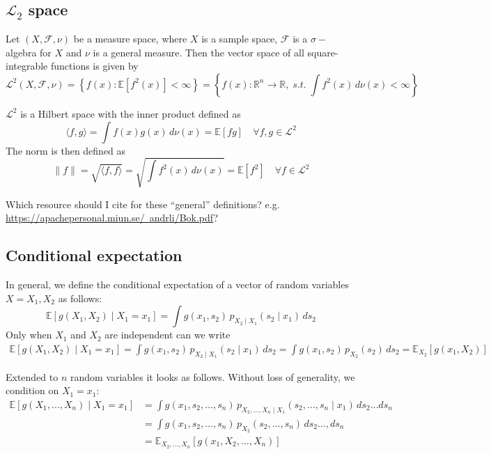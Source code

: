 \subsection{$\mathcal{L}_2$ space}
Let $(X, \mathcal{F}, \nu)$ be a measure space, where $X$ is a sample space, $\mathcal{F}$ is a $\sigma-$algebra for $X$ and $\nu$ is a general measure. Then the vector space of all square-integrable functions is given by
\[
\mathcal{L}^2(X, \mathcal{F}, \nu) = \left\{ f(x) : \mathbb{E}[f^2(x)] < \infty \right\}
= \left\{ f(x) : \mathbb{R}^{n} \to \mathbb{R}, \; \textit{s.t.} \; \int f^2(x)\, d\nu(x) < \infty \right\}
\]

$\mathcal{L}^2$ is a Hilbert space with the inner product defined as
\[
\langle f, g \rangle = \int f(x) g(x) \, d\nu(x) = \mathbb{E}[fg] \quad \forall f, g \in \mathcal{L}^2
\]
The norm is then defined as
\[
\|f\| = \sqrt{\langle f, f \rangle} = \sqrt{\int f^2(x) \, d\nu(x)} = \mathbb{E}[f^2] \quad \forall f \in \mathcal{L}^2
\]

{\color{blue} Which resource should I cite for these ``general'' definitions? e.g. \href{https://apachepersonal.miun.se/~andrli/Bok.pdf}{https://apachepersonal.miun.se/~andrli/Bok.pdf}?}



\subsection{Conditional expectation}
In general, we define the conditional expectation of a vector of random variables $X = X_1, X_2$ as follows:
\[
\mathbb{E}[g(X_1, X_2) \mid X_1 = x_1] = \int g(x_1, s_2) \, p_{X_2 \mid X_1}(s_2 \mid x_1) \, ds_2
\]
Only when $X_1$ and $X_2$ are independent can we write
\begin{align*}
    \mathbb{E}[g(X_1, X_2) \mid X_1 = x_1] = \int g(x_1, s_2) \, p_{X_2 \mid X_1}(s_2 \mid x_1) \, ds_2 = \int g(x_1, s_2) \, p_{X_2}(s_2) \, ds_2 = \mathbb{E}_{X_2}[g(x_1, X_2)]
\end{align*}

Extended to $n$ random variables it looks as follows. Without loss of generality, we condition on $X_1 = x_1$:
\begin{align*}
    \mathbb{E}[g(X_1, \dots, X_n) \mid X_1 = x_1] &= \int g(x_1, s_2, \dots, s_n) \, p_{X_2, \dots, X_n \mid X_1}(s_2, \dots, s_n \mid x_1) \, ds_2 \dots ds_n \\
    &= \int g(x_1, s_2, \dots, s_n) \, p_{X_2}(s_2, \dots, s_n) \, ds_2 \dots, ds_n \\
    &= \mathbb{E}_{X_2, \dots, X_n}[g(x_1, X_2, \dots, X_n)]
\end{align*}


